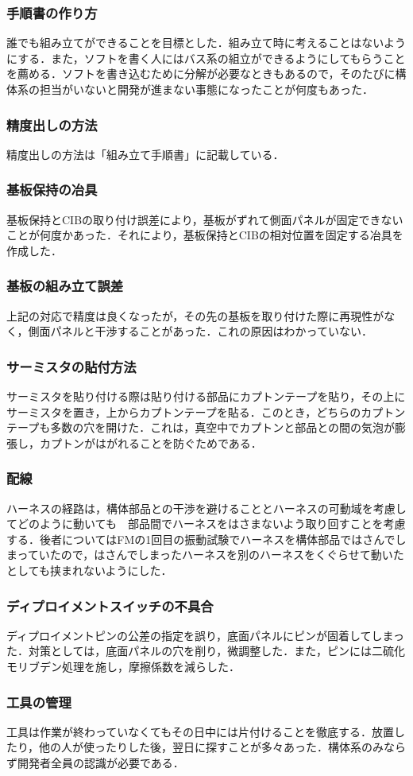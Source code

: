 \subsubsection{手順書の作り方}
誰でも組み立てができることを目標とした．組み立て時に考えることはないようにする．また，ソフトを書く人にはバス系の組立ができるようにしてもらうことを薦める．ソフトを書き込むために分解が必要なときもあるので，そのたびに構体系の担当がいないと開発が進まない事態になったことが何度もあった．
\subsubsection{精度出しの方法}
精度出しの方法は「組み立て手順書」に記載している．
\subsubsection{基板保持の冶具}
基板保持とCIBの取り付け誤差により，基板がずれて側面パネルが固定できないことが何度かあった．それにより，基板保持とCIBの相対位置を固定する冶具を作成した．
\subsubsection{基板の組み立て誤差}
上記の対応で精度は良くなったが，その先の基板を取り付けた際に再現性がなく，側面パネルと干渉することがあった．これの原因はわかっていない．
\subsubsection{サーミスタの貼付方法}
サーミスタを貼り付ける際は貼り付ける部品にカプトンテープを貼り，その上にサーミスタを置き，上からカプトンテープを貼る．このとき，どちらのカプトンテープも多数の穴を開けた．これは，真空中でカプトンと部品との間の気泡が膨張し，カプトンがはがれることを防ぐためである．
\subsubsection{配線}
ハーネスの経路は，構体部品との干渉を避けることとハーネスの可動域を考慮してどのように動いても　部品間でハーネスをはさまないよう取り回すことを考慮する．後者についてはFMの1回目の振動試験でハーネスを構体部品ではさんでしまっていたので，はさんでしまったハーネスを別のハーネスをくぐらせて動いたとしても挟まれないようにした．
\subsubsection{ディプロイメントスイッチの不具合}
ディプロイメントピンの公差の指定を誤り，底面パネルにピンが固着してしまった．対策としては，底面パネルの穴を削り，微調整した．また，ピンには二硫化モリブデン処理を施し，摩擦係数を減らした．
\subsubsection{工具の管理}
工具は作業が終わっていなくてもその日中には片付けることを徹底する．放置したり，他の人が使ったりした後，翌日に探すことが多々あった．構体系のみならず開発者全員の認識が必要である．


